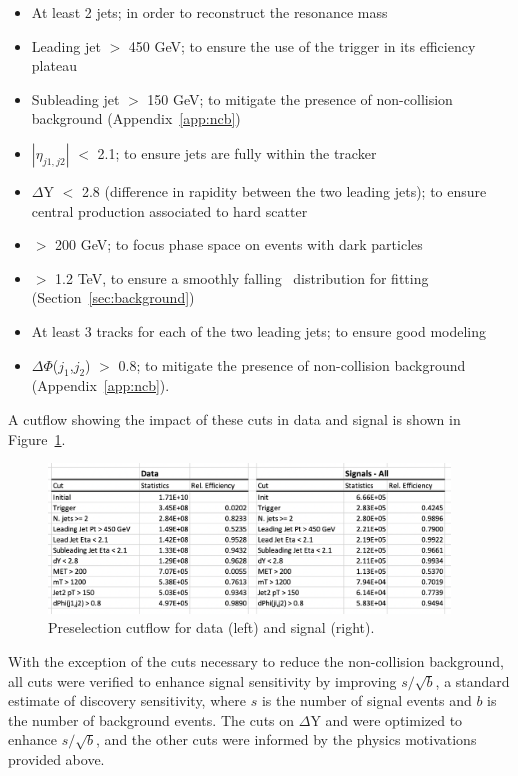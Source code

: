 \begin{itemize}
\item At least 2 jets; in order to reconstruct the resonance mass
\item Leading jet \pt $>$ 450 GeV; to ensure the use of the trigger in its efficiency plateau
\item Subleading jet \pt $>$ 150 GeV; to mitigate the presence of non-collision background (Appendix~\ref{app:ncb})
\item $|\eta_{j1,j2}|$ $<$ 2.1; to ensure jets are fully within the tracker
\item $\Delta$Y $<$ 2.8 (difference in rapidity between the two leading jets); to ensure central production associated to hard scatter  
\item \met $>$ 200 GeV; to focus phase space on events with dark particles 
\item \mt $>$ 1.2 TeV, to ensure a smoothly falling \mt~distribution for fitting (Section~\ref{sec:background})
\item At least 3 tracks for each of the two leading jets; to ensure good modeling
\item $\Delta\Phi$($j_1$,$j_2$) $>$ 0.8; to mitigate the presence of non-collision background (Appendix~\ref{app:ncb}).
\end{itemize}

A cutflow showing the impact of these cuts in data and signal is shown in Figure~\ref{fig:presel_cutflow}. 
\begin{figure}[!htbp]
\centering
   \includegraphics[width=0.95\textwidth]{figures/eventsel/preselection/presel_cutflow}
    \caption{Preselection cutflow for data (left) and signal (right).
    \label{fig:presel_cutflow}}
\end{figure}

With the exception of the cuts necessary to reduce the non-collision background, all cuts were verified to enhance signal sensitivity by improving $s/\sqrt{b}$, a standard estimate of discovery sensitivity, where $s$ is the number of signal events and $b$ is the number of background events. The cuts on $\Delta$Y and \met were optimized to enhance $s/\sqrt{b}$, and the other cuts were informed by the physics motivations provided above. \par

